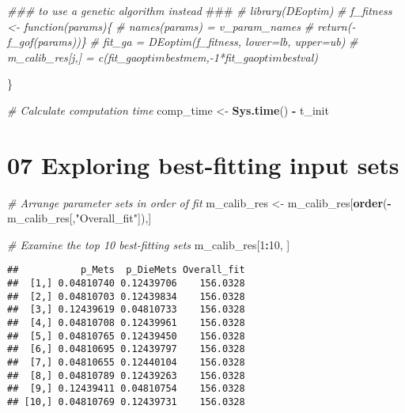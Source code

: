 \documentclass[
]{article}
\newenvironment{Shaded}{\begin{snugshade}}{\end{snugshade}}
\newcommand{\AlertTok}[1]{\textcolor[rgb]{0.94,0.16,0.16}{#1}}
\newcommand{\CommentTok}[1]{\textcolor[rgb]{0.56,0.35,0.01}{\textit{#1}}}
\newcommand{\DecValTok}[1]{\textcolor[rgb]{0.00,0.00,0.81}{#1}}
\newcommand{\KeywordTok}[1]{\textcolor[rgb]{0.13,0.29,0.53}{\textbf{#1}}}
\newcommand{\NormalTok}[1]{#1}
\newcommand{\OperatorTok}[1]{\textcolor[rgb]{0.81,0.36,0.00}{\textbf{#1}}}
\newcommand{\StringTok}[1]{\textcolor[rgb]{0.31,0.60,0.02}{#1}}
\begin{document}
\begin{Shaded}
\begin{Highlighting}[]
  \CommentTok{### to use a genetic algorithm instead }\AlertTok{###}
  \CommentTok{# library(DEoptim)}
  \CommentTok{# f_fitness <- function(params)\{}
  \CommentTok{#   names(params) = v_param_names}
  \CommentTok{#   return(-f_gof(params))\}}
  \CommentTok{# fit_ga = DEoptim(f_fitness, lower=lb, upper=ub)}
  \CommentTok{# m_calib_res[j,] = c(fit_ga$optim$bestmem,-1*fit_ga$optim$bestval)}

\NormalTok{  \}}

\CommentTok{# Calculate computation time}
\NormalTok{comp_time <-}\StringTok{ }\KeywordTok{Sys.time}\NormalTok{() }\OperatorTok{-}\StringTok{ }\NormalTok{t_init}
\end{Highlighting}
\end{Shaded}

\hypertarget{exploring-best-fitting-input-sets}{%
\section{07 Exploring best-fitting input
sets}\label{exploring-best-fitting-input-sets}}

\begin{Shaded}
\begin{Highlighting}[]
\CommentTok{# Arrange parameter sets in order of fit}
\NormalTok{m_calib_res <-}\StringTok{ }\NormalTok{m_calib_res[}\KeywordTok{order}\NormalTok{(}\OperatorTok{-}\NormalTok{m_calib_res[,}\StringTok{"Overall_fit"}\NormalTok{]),]}

\CommentTok{# Examine the top 10 best-fitting sets}
\NormalTok{m_calib_res[}\DecValTok{1}\OperatorTok{:}\DecValTok{10}\NormalTok{, ]}
\end{Highlighting}
\end{Shaded}

\begin{verbatim}
##           p_Mets  p_DieMets Overall_fit
##  [1,] 0.04810740 0.12439706    156.0328
##  [2,] 0.04810703 0.12439834    156.0328
##  [3,] 0.12439619 0.04810733    156.0328
##  [4,] 0.04810708 0.12439961    156.0328
##  [5,] 0.04810765 0.12439450    156.0328
##  [6,] 0.04810695 0.12439797    156.0328
##  [7,] 0.04810655 0.12440104    156.0328
##  [8,] 0.04810789 0.12439263    156.0328
##  [9,] 0.12439411 0.04810754    156.0328
## [10,] 0.04810769 0.12439731    156.0328
\end{verbatim}
\end{document}
